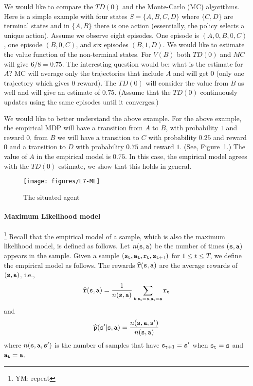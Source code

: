 
We would like to compare the $TD(0)$ and the Monte-Carlo (MC)
algorithms. Here is a simple example with four states
$S=\{A,B,C,D\}$ where $\{C,D\}$ are terminal states and in $\{A,B\}$
there is one action (essentially, the policy selects a unique
action). Assume we observe eight episodes. One episode is
$(A,0,B,0,C)$, one episode $(B,0,C)$, and six episodes $(B,1,D)$. We
would like to estimate the value function of the non-terminal
states. For $V(B)$ both $TD(0)$ and $MC$ will give $6/8=0.75$. The
interesting question would be: what is the estimate for $A$? MC will
average only the trajectories that include $A$ and will get $0$
(only one trajectory which gives $0$ reward). The $TD(0)$ will
consider the value from $B$ as well and will give an estimate of
$0.75$. (Assume that the $TD(0)$ continuously updates using the same
episodes until it converges.)

We would like to better understand the above example. For the above
example, the empirical MDP will have a transition from $A$ to $B$,
with probability $1$ and reward $0$, from $B$ we will have a
transition to $C$ with probability $0.25$ and reward $0$ and a
transition to $D$ with probability $0.75$ and reward $1$. (See,
Figure~\ref{fig:L7-ML}.) The value of $A$ in the empirical model is
$0.75$. In this case, the empirical model agrees with the $TD(0)$
estimate, we show that this holds in general.

\begin{figure}
  \begin{centering}
  \texttt{[image: figures/L7-ML]}\\
  \caption{The situated agent}\label{fig:L7-ML}
  \end{centering}
\end{figure}

\paragraph{Maximum Likelihood model}\footnote{YM: repeat} 
Recall that the empirical model of a sample, 
which is also the maximum likelihood model, is defined as follows. Let
$n({\tt s},{\tt a})$ be the number of times $({\tt s},{\tt a})$
appears in the sample. Given a sample
$({\tt s}_{\tt t},{\tt a}_{\tt t},{\tt r}_{\tt t},{\tt s}_{{\tt t}+1})$
for $1\leq t\leq T$, we define the empirical model as follows. The
rewards $\widehat{{\tt r}}({\tt s},{\tt a})$ are the average rewards
of $({\tt s},{\tt a})$, i.e.,
\[\widehat{{\tt r}}({\tt s},{\tt a})=\frac{1}{n({\tt s},{\tt a})}\sum_{{\tt t}:{\tt s}_{\tt t}={\tt s},{\tt a}_{\tt t}={\tt a}}{\tt r}_{\tt t}\]
and
\[\widehat{{\tt p}}({\tt s}'|{\tt s},{\tt a})=\frac{n({\tt s},{\tt a},{\tt s}')}{n({\tt s},{\tt a})}\]
where $n({\tt s},{\tt a},{\tt s}')$ is the number of samples that have
${\tt s}_{{\tt t}+1}={\tt s}'$ when ${\tt s}_{\tt t}={\tt s}$ and
${\tt a}_{\tt t} ={\tt a}$.

